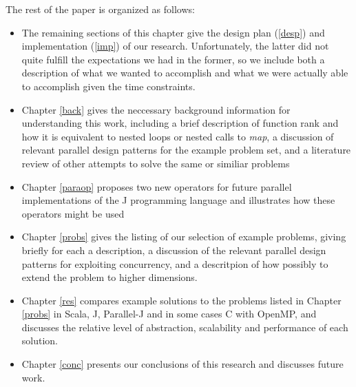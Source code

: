 The rest of the paper is organized as follows:
\begin{itemize} 
	\item The remaining sections of this chapter give the design plan (\ref{desp}) and implementation (\ref{imp}) of our research. 
	Unfortunately, the latter did not quite fulfill the expectations we had in the former, so we include both a description of what we wanted to accomplish and what we were actually able to accomplish given the time constraints. 
	\item Chapter \ref{back} gives the neccessary background information for understanding this work, 
	including a brief description of function rank and how it is equivalent to nested loops or nested calls to \textit{map},
	a discussion of relevant parallel design patterns for the example problem set, 
	and a literature review of other attempts to solve the same or similiar problems
	\item Chapter \ref{paraop} proposes two new operators for future parallel implementations of the J programming language 
		and illustrates how these operators might be used
    \item Chapter \ref{probs} gives the listing of our selection of example problems, giving briefly for each a description, a discussion of the relevant parallel design patterns for exploiting concurrency, and a descritpion of how possibly to extend the problem to higher dimensions.
    \item Chapter \ref{res} compares example solutions to the problems listed in Chapter \ref{probs} in Scala, J, Parallel-J and in some cases C with OpenMP, and discusses the relative level of abstraction, scalability and performance of each solution. %
    \item Chapter \ref{conc} presents our conclusions of this research and discusses future work. 
\end{itemize}

